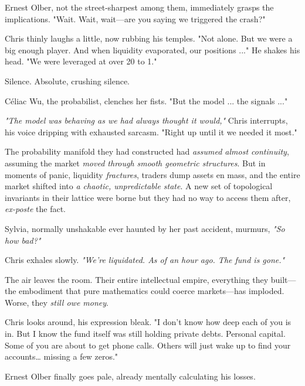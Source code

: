 Ernest Olber, not the street-sharpest among them, immediately grasps the implications. "Wait. Wait, wait—are you saying we triggered the crash?"

\smallskip

Chris thinly laughs a little, now rubbing his temples. "Not alone. But we were a big enough player. And when liquidity evaporated, our positions ..." He shakes his head. "We were leveraged at over 20 to 1."

\smallskip

Silence. Absolute, crushing silence.

\smallskip

Céliac Wu, the probabilist, clenches her fists. "But the model ... the signals ..."

\textit{"The model was behaving as we had always thought it would,"} Chris interrupts, his voice dripping with exhausted sarcasm. "Right up until it we needed it most."

The probability manifold they had constructed had \textit{assumed almost continuity}, assuming the market \textit{moved through smooth geometric structures}. But in moments of panic, liquidity \textit{fractures}, traders dump assets en mass, and the entire market shifted into \textit{a chaotic, unpredictable state}. A new set of topological invariants in their lattice were borne but they had no way to access them after, \textit{ex-poste} the fact.

\smallskip

Sylvia, normally unshakable ever haunted by her past accident, murmurs, \textit{"So how bad?"}

\smallskip

Chris exhales slowly. \textit{"We’re liquidated. As of an hour ago. The fund is gone."}

\smallskip

The air leaves the room. Their entire intellectual empire, everything they built—the embodiment that pure mathematics could coerce markets—has imploded. Worse, they \textit{still owe money}.

\smallskip

Chris looks around, his expression bleak. "I don’t know how deep each of you is in. But I know the fund itself was still holding private debts. Personal capital. Some of you are about to get phone calls. Others will just wake up to find your accounts… missing a few zeros."

Ernest Olber finally goes pale, already mentally calculating his losses.

